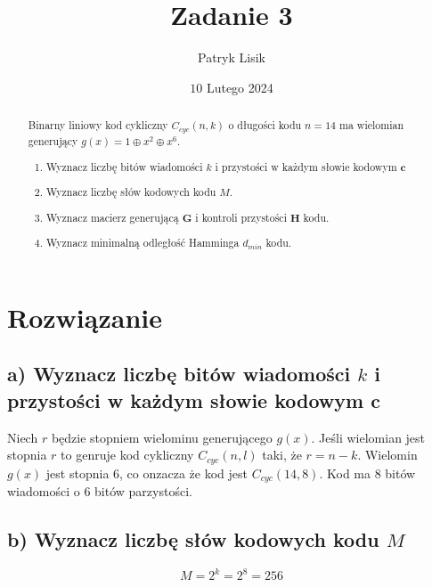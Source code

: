\documentclass[12pt]{article}
\title{Zadanie 3}
\author{Patryk Lisik}
\date{\(10\) Lutego  2024}
\begin{document}
    \maketitle
    \renewcommand{\abstractname}{Treść}

    \begin{abstract}
    Binarny liniowy kod cykliczny $C_{cyc}(n,k)$ o długości kodu $n=14$ ma wielomian generujący
        $g(x) = 1 \oplus x^2 \oplus x^6$.

    \begin{enumerate}[label=(\alph*)]
        \item Wyznacz liczbę bitów wiadomości $k$ i przystości w każdym słowie kodowym $\mathbf{c}$
        \item Wyznacz liczbę słów kodowych kodu $M$.
        \item Wyznacz macierz generującą $\mathbf{G}$ i kontroli przystości $\mathbf{H}$ kodu. 
        \item Wyznacz minimalną odległość Hamminga $d_{min}$ kodu. 
    \end{enumerate}
    \end{abstract}



    \section*{Rozwiązanie}
    \subsection*{a) Wyznacz liczbę bitów wiadomości $k$ i przystości w każdym słowie kodowym $\mathbf{c}$} 
    Niech $r$ będzie stopniem wielominu generującego $g(x)$. Jeśli wielomian jest stopnia $r$ to genruje kod cykliczny
    $C_{cyc}(n,l) $ taki, że $r=n-k$. Wielomin $g(x)$ jest stopnia 6, co onzacza że kod jest $C_{cyc}(14, 8)$.   
    Kod ma 8 bitów wiadomości o 6 bitów parzystości.

    \subsection*{b) Wyznacz liczbę słów kodowych kodu $M$} 

    $$M=2^k=2^8=256 $$
\end{document}
